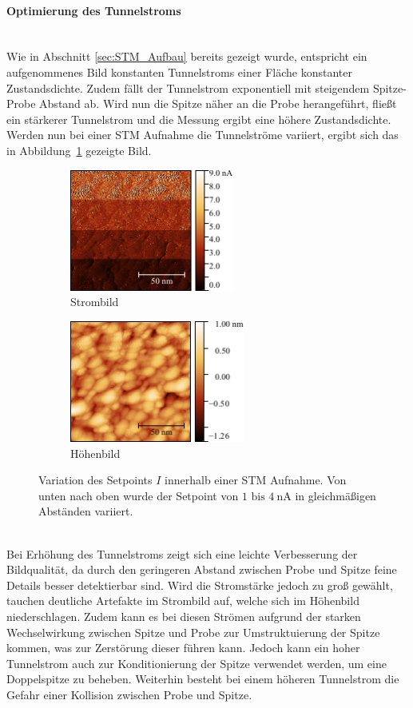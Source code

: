 \documentclass[a4paper,twoside,final]{article}
\begin{document}
\paragraph{Optimierung des Tunnelstroms}$~$\\
Wie in Abschnitt \ref{sec:STM_Aufbau} bereits gezeigt wurde, entspricht ein aufgenommenes Bild konstanten Tunnelstroms einer Fläche konstanter Zustandsdichte. Zudem fällt der Tunnelstrom exponentiell mit steigendem Spitze-Probe Abstand ab. Wird nun die Spitze näher an die Probe herangeführt, fließt ein stärkerer Tunnelstrom und die Messung ergibt eine höhere Zustandsdichte. Werden nun bei einer STM Aufnahme die Tunnelströme variiert, ergibt sich das in Abbildung~\ref{fig:Stromvariation_1} gezeigte Bild.
\begin{figure}[htp]
    \centering
    \begin{subfigure}{0.45\textwidth}
        \includegraphics[height=4cm]{Bilder/Image01958_Stromvariation_Strom.pdf}
        \caption{Strombild}
    \end{subfigure}
    \hspace{0.5cm}
    \begin{subfigure}{0.45\textwidth}
        \includegraphics[height=4cm]{Bilder/Image01958_Stromvariation.pdf}
        \caption{Höhenbild}
    \end{subfigure}
    \caption{Variation des Setpoints $I$ innerhalb einer STM Aufnahme. Von unten nach oben wurde der Setpoint von $1 \text{ bis } \SI{4}{\nano\ampere}$ in gleichmäßigen Abständen variiert.}
    \label{fig:Stromvariation_1}
\end{figure}\\
Bei Erhöhung des Tunnelstroms zeigt sich eine leichte Verbesserung der Bildqualität, da durch den geringeren Abstand zwischen Probe und Spitze feine Details besser detektierbar sind. Wird die Stromstärke jedoch zu groß gewählt, tauchen deutliche Artefakte im Strombild auf, welche sich im Höhenbild niederschlagen. Zudem kann es bei diesen Strömen aufgrund der starken Wechselwirkung zwischen Spitze und Probe zur Umstruktuierung der Spitze kommen, was zur Zerstörung dieser führen kann. Jedoch kann ein hoher Tunnelstrom auch zur Konditionierung der Spitze verwendet werden, um eine Doppelspitze zu beheben. Weiterhin besteht bei einem höheren Tunnelstrom die Gefahr einer Kollision zwischen Probe und Spitze.\\
\end{document}
